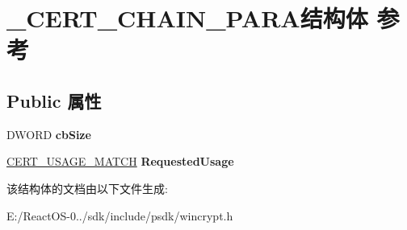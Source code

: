 \hypertarget{struct___c_e_r_t___c_h_a_i_n___p_a_r_a}{}\section{\+\_\+\+C\+E\+R\+T\+\_\+\+C\+H\+A\+I\+N\+\_\+\+P\+A\+R\+A结构体 参考}
\label{struct___c_e_r_t___c_h_a_i_n___p_a_r_a}
\subsection*{Public 属性}
\begin{DoxyCompactItemize}
\item 
\mbox{\label{struct___c_e_r_t___c_h_a_i_n___p_a_r_a_a8ddcf9c4ecce480dba49c53b9d2739d8}} 
D\+W\+O\+RD {\bfseries cb\+Size}
\item 
\mbox{\label{struct___c_e_r_t___c_h_a_i_n___p_a_r_a_a80f4beba9481e93f7fca3b23215cf699}} 
\hyperlink{struct___c_e_r_t___u_s_a_g_e___m_a_t_c_h}{C\+E\+R\+T\+\_\+\+U\+S\+A\+G\+E\+\_\+\+M\+A\+T\+CH} {\bfseries Requested\+Usage}
\end{DoxyCompactItemize}


该结构体的文档由以下文件生成\+:\begin{DoxyCompactItemize}
\item 
E\+:/\+React\+O\+S-\/0../sdk/include/psdk/wincrypt.\+h\end{DoxyCompactItemize}
